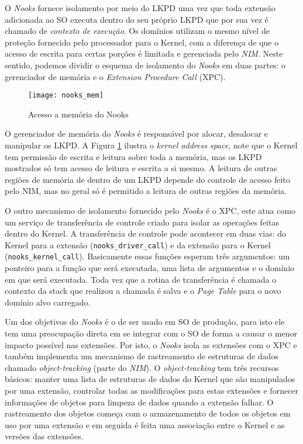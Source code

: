 O \emph{Nooks} fornece isolamento por meio do LKPD uma vez que toda extensão
adicionada ao SO executa dentro do seu próprio LKPD que por sua vez é chamado
de \emph{contexto de execução}. Os domínios utilizam o mesmo nível de proteção
fornecido pelo processador para o Kernel, com a diferença de que o acesso de
escrita para certas porções é limitada e gerenciada pelo \emph{NIM}. Neste
sentido, podemos dividir o esquema de isolamento do \emph{Nooks} em duas partes:
o gerenciador de memória e o \emph{Extension Procedure Call} (XPC).

\begin{figure}[!h]
  \centering
  \texttt{[image: nooks\_mem]}
  \caption{Acesso a memória do Nooks \citep{nooks}}
  \label{fig:nooks_mem}
\end{figure}

O gerenciador de memória do \emph{Nooks} é responsável por alocar, desalocar e
manipular os LKPD. A Figura \ref{fig:nooks_mem} ilustra o \textit{kernel
address space}, note que o Kernel tem permissão de escrita e leitura sobre toda
a memória, mas os LKPD mostrados só tem acesso de leitura e escrita a si mesmo.
A leitura de outras regiões de memória de dentro de um LKPD depende do controle
de acesso feito pelo NIM, mas no geral só é permitido a leitura de outras
regiões da memória.

O outro mecanismo de isolamento fornecido pelo \emph{Nooks} é o XPC, este atua
como um serviço de transferência de controle criado para isolar as operações
feitas dentro do Kernel. A transferência de controle pode acontecer em duas
vias: do Kernel para a extensão (\texttt{nooks\_driver\_call}) e da extensão
para o Kernel (\texttt{nooks\_kernel\_call}). Basicamente essas funções esperam
três argumentos: um ponteiro para a função que será executada, uma lista de
argumentos e o domínio em que será executada. Toda vez que a rotina de
transferência é chamada o contexto da stack que realizou a chamada é salva e o
\emph{Page Table} para o novo domínio alvo carregado.

Um dos objetivos do \emph{Nooks} é o de ser usado em SO de produção, para isto
ele tem uma preocupação direta em se integrar com o SO de forma a causar o
menor impacto possível nas extensões. Por isto, o \emph{Nooks} isola as
extensões com o XPC e também implementa um mecanismo de rastreamento de
estruturas de dados chamado \emph{object-tracking} (parte do \emph{NIM}). O
\emph{object-tracking} tem três recursos básicos: manter uma lista de
estruturas de dados do Kernel que são manipulados por uma extensão, controlar
todas as modificações para estas extensões e fornecer informações de objetos
para limpeza de dados quando a extensão falhar. O rastreamento dos objetos
começa com o armazenamento de todos os objetos em uso por uma extensão e em
seguida é feita uma associação entre o Kernel e as versões das extensões.


